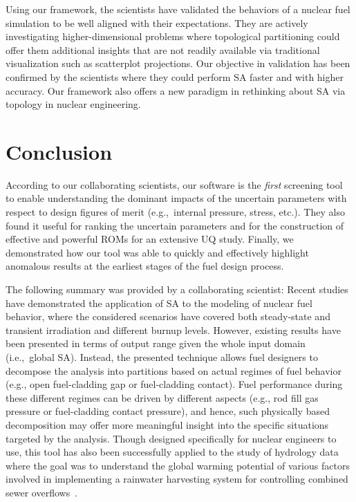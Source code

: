 Using our framework, the scientists have validated the behaviors of a nuclear fuel simulation to be well aligned with their expectations.
%
They are actively investigating higher-dimensional problems where topological partitioning could offer them additional insights that are not readily available via traditional visualization such as scatterplot projections.
%
Our objective in validation has been confirmed by the scientists where they could perform SA faster and with higher accuracy.
%
Our framework also offers a new paradigm in rethinking about SA via topology in nuclear engineering.

\section{Conclusion}
According to our collaborating scientists, our software is the \emph{first} screening tool to enable understanding the dominant impacts of the uncertain parameters with respect to design figures of merit (e.g.,\ internal pressure, stress, etc.).
%
They also found it useful for ranking the uncertain parameters and for the construction of effective and powerful ROMs for an extensive UQ study.
%
Finally, we demonstrated how our tool was able to quickly and effectively highlight anomalous results at the earliest stages of the fuel design process.

The following summary was provided by a collaborating scientist: Recent studies~\cite{BouloreStruzikGaudier2012,IkonenTulkki2014,PastoreSwilerHales2015} have demonstrated the application of SA to the modeling of nuclear fuel behavior, where the considered scenarios have covered both steady-state and transient irradiation and different burnup levels.
%
However, existing results have been presented in terms of output range given the whole input domain (i.e.,\ global SA).
%
Instead, the presented technique allows fuel designers to decompose the analysis into partitions based on actual regimes of fuel behavior (e.g., open fuel-cladding gap or fuel-cladding contact).
%
Fuel performance during these different regimes can be driven by different aspects (e.g., rod fill gas pressure or fuel-cladding contact pressure), and hence, such physically based decomposition may offer more meaningful insight into the specific situations targeted by the analysis.
%
Though designed specifically for nuclear engineers to use, this tool has also been successfully applied to the study of hydrology data where the goal was to understand the global warming potential of various factors involved in implementing a rainwater harvesting system for controlling combined sewer overflows~\cite{Tavakol-Davani2016}.


% 